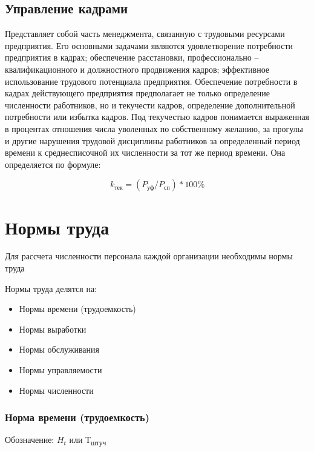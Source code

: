\documentclass[11pt]{article}
\begin{document}
\subsection{Управление кадрами}
\label{sec:org4f5bdac}

Представляет собой часть менеджмента, связанную с трудовыми ресурсами
предприятия. Его основными задачами являются удовлетворение потребности
предприятия в кадрах; обеспечение расстановки, профессионально – квалификационного
и должностного продвижения кадров; эффективное использование трудового потенциала
предприятия.
Обеспечение потребности в кадрах действующего предприятия предполагает не
только определение численности работников, но и текучести кадров, определение
дополнительной потребности или избытка кадров.
Под текучестью кадров понимается выраженная в процентах отношения числа
уволенных по собственному желанию, за прогулы и другие нарушения трудовой
дисциплины работников за определенный период времени к среднесписочной их
численности за тот же период времени. Она определяется по формуле:

\begin{equation}
k_{\text{тек}} = (P_{\text{уф}}/P_{\text{сп}})*100\%  
\end{equation}






\section{Нормы труда}
\label{sec:org52cbc4c}

Для рассчета численности персонала каждой организации необходимы нормы труда

Нормы труда делятся на:

\begin{itemize}
\item Нормы времени (трудоемкость)
\item Нормы выработки
\item Нормы обслуживания
\item Нормы управляемости
\item Нормы численности
\end{itemize}


\subsubsection{Норма времени (трудоемкость)}
\label{sec:orgf7254f7}

Обозначение: \(H_{t}\) или Т\textsubscript{штуч}
\end{document}
